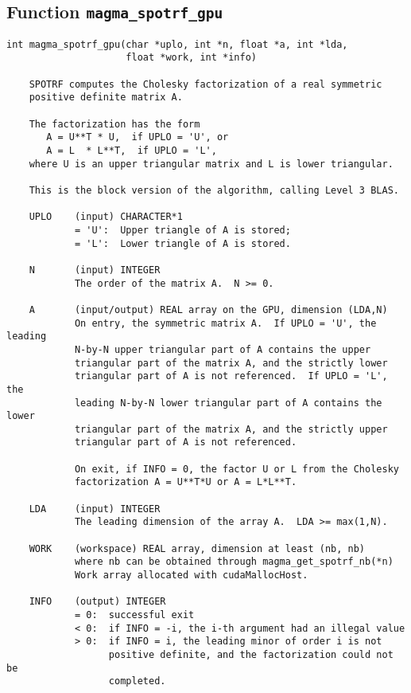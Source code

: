 \documentclass[10pt]{book}
\begin{document}
\subsection{Function {\tt {\bf magma\_spotrf\_gpu}}}
\begin{verbatim}
int magma_spotrf_gpu(char *uplo, int *n, float *a, int *lda, 
                     float *work, int *info)
   
    SPOTRF computes the Cholesky factorization of a real symmetric   
    positive definite matrix A.   

    The factorization has the form   
       A = U**T * U,  if UPLO = 'U', or   
       A = L  * L**T,  if UPLO = 'L',   
    where U is an upper triangular matrix and L is lower triangular.   

    This is the block version of the algorithm, calling Level 3 BLAS.   

    UPLO    (input) CHARACTER*1   
            = 'U':  Upper triangle of A is stored;   
            = 'L':  Lower triangle of A is stored.   

    N       (input) INTEGER   
            The order of the matrix A.  N >= 0.   

    A       (input/output) REAL array on the GPU, dimension (LDA,N)   
            On entry, the symmetric matrix A.  If UPLO = 'U', the leading   
            N-by-N upper triangular part of A contains the upper   
            triangular part of the matrix A, and the strictly lower   
            triangular part of A is not referenced.  If UPLO = 'L', the   
            leading N-by-N lower triangular part of A contains the lower   
            triangular part of the matrix A, and the strictly upper   
            triangular part of A is not referenced.   

            On exit, if INFO = 0, the factor U or L from the Cholesky   
            factorization A = U**T*U or A = L*L**T.   

    LDA     (input) INTEGER   
            The leading dimension of the array A.  LDA >= max(1,N).   

    WORK    (workspace) REAL array, dimension at least (nb, nb)
            where nb can be obtained through magma_get_spotrf_nb(*n)
            Work array allocated with cudaMallocHost.

    INFO    (output) INTEGER   
            = 0:  successful exit   
            < 0:  if INFO = -i, the i-th argument had an illegal value   
            > 0:  if INFO = i, the leading minor of order i is not   
                  positive definite, and the factorization could not be   
                  completed.   
\end{verbatim}
\end{document}
